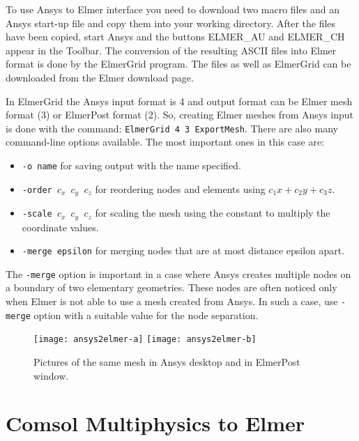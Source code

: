 To use Ansys to Elmer interface you need to download two macro files
and an Ansys start-up file and copy them into your working
directory. After the files have been copied, start Ansys and the
buttons ELMER\_AU and ELMER\_CH appear in the Toolbar. The conversion of
the resulting ASCII files into Elmer format is done by the ElmerGrid
program. The files as well as ElmerGrid can be downloaded from the
Elmer download page.

%
%
In ElmerGrid the Ansys input format is 4 and output
format can be Elmer mesh format (3) or ElmerPost format (2). So,
creating Elmer meshes from Ansys input is done with the command:
\texttt{ElmerGrid 4 3 ExportMesh}. There are also many command-line 
options available. The
most important ones in this case are:
%
\begin{itemize}
  \item \texttt{-o name} for saving output with the name specified.  
  \item \texttt{-order $c_x$ $c_y$ $c_z$} for reordering nodes and elements using $c_1x+c_2y +c_3z$.  
  \item \texttt{-scale $c_x$ $c_y$ $c_z$} for scaling the mesh using the constant to multiply
the coordinate values.
  \item \texttt{-merge epsilon} for merging nodes that are at most distance epsilon apart.
\end{itemize}

The \texttt{-merge} option is important in a case where Ansys creates multiple
nodes on a boundary of two elementary geometries. These nodes are
often noticed only when Elmer is not able to use a mesh created from
Ansys. In such a case, use \texttt{-merge} option with a suitable value 
for the node separation.

\begin{figure}
\begin{center}
\texttt{[image: ansys2elmer-a]}
\hspace{10mm}
\texttt{[image: ansys2elmer-b]}
\end{center}
\caption{Pictures of the same mesh in Ansys desktop and in ElmerPost window.}
\end{figure}


\section{Comsol Multiphysics to Elmer}

